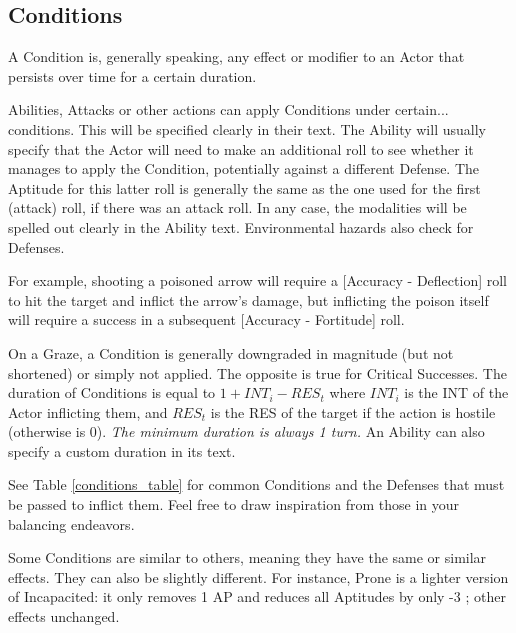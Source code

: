 \subsection{Conditions}
\label{conditions}

A Condition is, generally speaking, any effect or modifier to an Actor that persists over time for a certain duration.

Abilities, Attacks or other actions can apply Conditions under certain... conditions. This will be specified clearly in their text. The Ability will usually specify that the Actor will need to make an additional roll to see whether it manages to apply the Condition, potentially against a different Defense. The Aptitude for this latter roll is generally the same as the one used for the first (attack) roll, if there was an attack roll. In any case, the modalities will be spelled out clearly in the Ability text. Environmental hazards also check for Defenses. 

For example, shooting a poisoned arrow will require a [Accuracy - Deflection] roll to hit the target and inflict the arrow's damage, but inflicting the poison itself will require a success in a subsequent [Accuracy - Fortitude] roll.

On a Graze, a Condition is generally downgraded in magnitude (but not shortened) or simply not applied. The opposite is true for Critical Successes. The duration of Conditions is equal to $1+INT_i-RES_t$ where $INT_i$ is the INT of the Actor inflicting them, and $RES_t$ is the RES of the target if the action is hostile (otherwise is 0). \textit{The minimum duration is always 1 turn.} An Ability can also specify a custom duration in its text.

See Table \ref{conditions_table} for common Conditions and the Defenses that must be passed to inflict them. Feel free to draw inspiration from those in your balancing endeavors.

Some Conditions are similar to others, meaning they have the same or similar effects. They can also be slightly different. For instance, Prone is a lighter version of Incapacited: it only removes 1 AP and reduces all Aptitudes by only -3 ; other effects unchanged.

